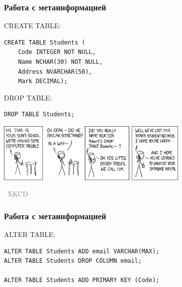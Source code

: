 \documentclass[xetex,mathserif,serif]{beamer}
\newcommand{\attribution}[1] {
\vspace{-5mm}\begin{flushright}\begin{scriptsize}\textcolor{gray}{\textcopyright\, #1}\end{scriptsize}\end{flushright}
}
\begin{document}
	\begin{frame}[fragile]
		\frametitle{Работа с метаинформацией}
		\begin{small}
			CREATE TABLE:
			\begin{verbatim}
CREATE TABLE Students (
    Code INTEGER NOT NULL,
    Name NCHAR(30) NOT NULL,
    Address NVARCHAR(50),
    Mark DECIMAL);
			\end{verbatim}

			\vspace{3mm}
			DROP TABLE:
			\begin{verbatim}
DROP TABLE Students;
			\end{verbatim}
		\end{small}

		\begin{center}
			\includegraphics[width=0.7\textwidth]{bobbyTables.png}
			\attribution{XKCD}
		\end{center}
	\end{frame}

	\begin{frame}[fragile]
		\frametitle{Работа с метаинформацией}
		ALTER TABLE:
		\begin{verbatim}
ALTER TABLE Students ADD email VARCHAR(MAX);
ALTER TABLE Students DROP COLUMN email;

ALTER TABLE Students ADD PRIMARY KEY (Code);

		\end{verbatim}
	\end{frame}
\end{document}
